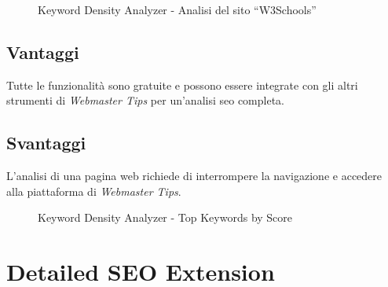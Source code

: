 \begin{figure}[H]
    \centering 
    \caption{Keyword Density Analyzer - Analisi del sito “W3Schools”}
    \label{fig:keyword_density_analyzer_w3schools}
\end{figure}

\subsection{Vantaggi}
\par Tutte le funzionalità sono gratuite e possono essere integrate con gli altri strumenti di \textit{Webmaster Tips} per un'analisi \gls{seo} completa.

\subsection{Svantaggi}
\par L'analisi di una pagina web richiede di interrompere la navigazione e accedere alla piattaforma di \textit{Webmaster Tips}.

\begin{figure}[H]
    \centering 
    \caption{Keyword Density Analyzer - Top Keywords by Score}
    \label{fig:keyword_density_analyzer}
\end{figure}

\section{Detailed SEO Extension}

